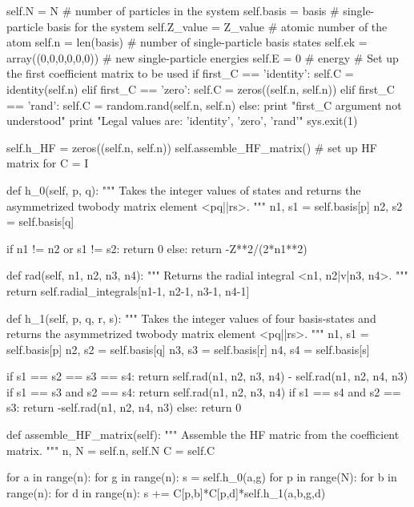 \documentclass[%
oneside,                 %
final,                   %
10pt]{article}
\newenvironment{doconceexercise}{}{}
\begin{document}
\begin{doconceexercise}
        self.N = N # number of particles in the system
        self.basis = basis # single-particle basis for the system
        self.Z_value = Z_value # atomic number of the atom
        self.n = len(basis) # number of single-particle basis states
        self.ek = array((0,0,0,0,0,0)) # new single-particle energies
        self.E = 0 # energy
        # Set up the first coefficient matrix to be used
        if first_C == 'identity':
            self.C = identity(self.n)
        elif first_C == 'zero':
            self.C = zeros((self.n, self.n))
        elif first_C == 'rand':
            self.C = random.rand(self.n, self.n)
        else:
            print "first_C argument not understood"
            print "Legal values are: 'identity', 'zero', 'rand'"
            sys.exit(1)

        self.h_HF = zeros((self.n, self.n))
        self.assemble_HF_matrix() # set up HF matrix for C = I

    def h_0(self, p, q):
        """
        Takes the integer values of states and returns the 
        asymmetrized twobody matrix element <pq||rs>.
        """
        n1, s1 = self.basis[p]
        n2, s2 = self.basis[q]

        if n1 != n2 or s1 != s2:
            return 0
        else:
            return -Z**2/(2*n1**2)

    def rad(self, n1, n2, n3, n4):
        """
        Returns the radial integral <n1, n2|v|n3, n4>.
        """
        return self.radial_integrals[n1-1, n2-1, n3-1, n4-1]

    def h_1(self, p, q, r, s):
        """
        Takes the integer values of four basis-states and returns
        the asymmetrized twobody matrix element <pq||rs>.
        """
        n1, s1 = self.basis[p]
        n2, s2 = self.basis[q]
        n3, s3 = self.basis[r]
        n4, s4 = self.basis[s]

        if s1 == s2 == s3 == s4:
            return self.rad(n1, n2, n3, n4) - self.rad(n1, n2, n4, n3)
        if s1 == s3 and s2 == s4:
            return self.rad(n1, n2, n3, n4)
        if s1 == s4 and s2 == s3:
            return -self.rad(n1, n2, n4, n3)
        else:
            return 0

    def assemble_HF_matrix(self):
        """
        Assemble the HF matric from the coefficient matrix.
        """
        n, N = self.n, self.N
        C = self.C

        for a in range(n):
            for g in range(n):
                s = self.h_0(a,g)
                for p in range(N):
                    for b in range(n):
                        for d in range(n):
                            s += C[p,b]*C[p,d]*self.h_1(a,b,g,d)


\end{doconceexercise}
\end{document}
